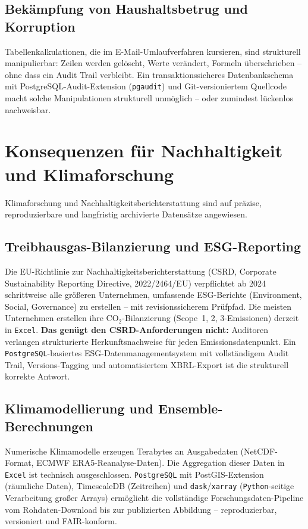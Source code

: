 \documentclass[12pt,a4paper]{report}
\theoremstyle{definition}
\theoremstyle{remark}
\newcommand{\excel}{\texttt{Excel}}
\newcommand{\pg}{\texttt{PostgreSQL}}
\newcommand{\py}{\texttt{Python}}
\newcommand{\code}[1]{\texttt{#1}}
\begin{document}
\subsection{Bekämpfung von Haushaltsbetrug und Korruption}

Tabellenkalkulationen, die im E-Mail-Umlaufverfahren kursieren, sind
strukturell manipulierbar: Zeilen werden gelöscht, Werte verändert,
Formeln überschrieben -- ohne dass ein Audit Trail verbleibt.
Ein transaktionssicheres Datenbankschema mit PostgreSQL-Audit-Extension
(\code{pgaudit}) und Git-versioniertem Quellcode macht solche
Manipulationen strukturell unmöglich -- oder zumindest lückenlos
nachweisbar.

\section{Konsequenzen für Nachhaltigkeit und Klimaforschung}

Klimaforschung und Nachhaltigkeitsberichterstattung sind auf präzise,
reproduzierbare und langfristig archivierte Datensätze angewiesen.

\subsection{Treibhausgas-Bilanzierung und ESG-Reporting}

Die EU-Richtlinie zur Nachhaltigkeitsberichterstattung (CSRD,
Corporate Sustainability Reporting Directive, 2022/2464/EU)
verpflichtet ab 2024 schrittweise alle größeren Unternehmen,
umfassende ESG-Berichte (Environment, Social, Governance) zu erstellen
-- mit revisionssicherem Prüfpfad.
Die meisten Unternehmen erstellen ihre CO$_2$-Bilanzierung
(Scope~1, 2, 3-Emissionen) derzeit in \excel{}.
\textbf{Das genügt den CSRD-Anforderungen nicht:}
Auditoren verlangen strukturierte Herkunftsnachweise für jeden
Emissionsdatenpunkt.
Ein \pg-basiertes ESG-Datenmanagementsystem mit vollständigem Audit
Trail, Versions-Tagging und automatisiertem XBRL-Export ist die
strukturell korrekte Antwort.

\subsection{Klimamodellierung und Ensemble-Berechnungen}

Numerische Klimamodelle erzeugen Terabytes an Ausgabedaten
(NetCDF-Format, ECMWF ERA5-Reanalyse-Daten).
Die Aggregation dieser Daten in \excel{} ist technisch ausgeschlossen.
\pg{} mit PostGIS-Extension (räumliche Daten), TimescaleDB
(Zeitreihen) und \code{dask}/\code{xarray} (\py-seitige Verarbeitung
großer Arrays) ermöglicht die vollständige Forschungsdaten-Pipeline
vom Rohdaten-Download bis zur publizierten Abbildung --
reproduzierbar, versioniert und FAIR-konform.
\end{document}
